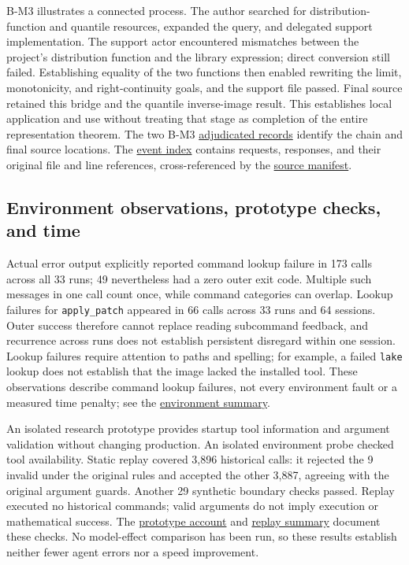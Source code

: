 B-M3 illustrates a connected process. The author searched for distribution-function and quantile resources, expanded the query, and delegated support implementation. The support actor encountered mismatches between the project's distribution function and the library expression; direct conversion still failed. Establishing equality of the two functions then enabled rewriting the limit, monotonicity, and right-continuity goals, and the support file passed. Final source retained this bridge and the quantile inverse-image result. This establishes local application and use without treating that stage as completion of the entire representation theorem. The two B-M3 \href{research/semantic/adjudicated_annotations.json}{adjudicated records} identify the chain and final source locations. The \href{research/extraction/events.jsonl}{event index} contains requests, responses, and their original file and line references, cross-referenced by the \href{research/extraction/source_manifest.json}{source manifest}.

\subsection[Environment observations, prototype checks, and time]{\texorpdfstring{\protect\hypertarget{s4}{}Environment observations, prototype checks, and time}{Environment observations, prototype checks, and time}}
Actual error output explicitly reported command lookup failure in 173 calls across all 33 runs; 49 nevertheless had a zero outer exit code. Multiple such messages in one call count once, while command categories can overlap. Lookup failures for \nolinkurl{apply_patch} appeared in 66 calls across 33 runs and 64 sessions. Outer success therefore cannot replace reading subcommand feedback, and recurrence across runs does not establish persistent disregard within one session. Lookup failures require attention to paths and spelling; for example, a failed \nolinkurl{lake} lookup does not establish that the image lacked the installed tool. These observations describe command lookup failures, not every environment fault or a measured time penalty; see the \href{research/analysis/environment_summary.json}{environment summary}.

An isolated research prototype provides startup tool information and argument validation without changing production. An isolated environment probe checked tool availability. Static replay covered 3,896 historical calls: it rejected the 9 invalid under the original rules and accepted the other 3,887, agreeing with the original argument guards. Another 29 synthetic boundary checks passed. Replay executed no historical commands; valid arguments do not imply execution or mathematical success. The \href{research/interventions/README.zh-CN.md}{prototype account} and \href{research/interventions/argument_replay/summary.json}{replay summary} document these checks. No model-effect comparison has been run, so these results establish neither fewer agent errors nor a speed improvement.

